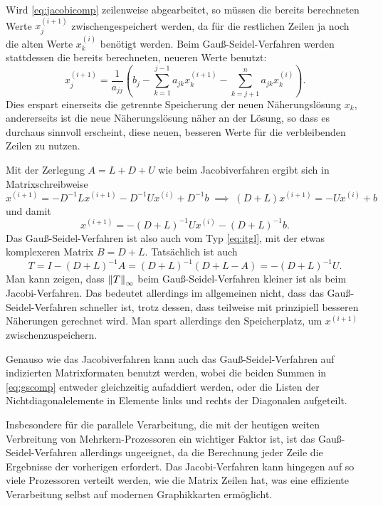 Wird \eqref{eq:jacobicomp} zeilenweise abgearbeitet, so müssen die
bereits berechneten Werte $x_j^{(i+1)}$ zwischengespeichert werden,
da für die restlichen Zeilen ja noch die alten Werte $x_k^{(i)}$
benötigt werden. Beim Gauß-Seidel-Verfahren werden stattdessen die
bereits berechneten, neueren Werte benutzt:
\begin{equation}
  \label{eq:gscomp}
  x_j^{(i+1)} = \frac{1}{a_{jj}}\left(b_j -
    \sum_{k=1}^{j-1} a_{jk}x_k^{(i+1)} - \sum_{k=j+1}^n a_{jk}x_k^{(i)}\right).
\end{equation}
Dies erspart einerseits die getrennte Speicherung der neuen
Näherungslösung $x_k$, andererseits ist die neue Näherungslösung näher
an der Lösung, so dass es durchaus sinnvoll erscheint, diese neuen, besseren
Werte für die verbleibenden Zeilen zu nutzen.

Mit der Zerlegung $A=L + D + U$ wie beim Jacobiverfahren ergibt sich
in Matrixschreibweise
\begin{equation}
  x^{(i+1)} = -D^{-1}L x^{(i+1)} - D^{-1} U x^{(i)} + D^{-1}b
  \;\implies\;
  (D + L)x^{(i+1)} = - U x^{(i)} + b
\end{equation}
und damit
\begin{equation}
  x^{(i+1)} = -(D+L)^{-1} U x^{(i)} - (D+L)^{-1}b.
\end{equation}
Das Gauß-Seidel-Verfahren ist also auch vom Typ \eqref{eq:itgl}, mit
der etwas komplexeren Matrix $B= D + L$. Tatsächlich ist auch
\begin{equation}
  \label{eq:gst}
  T = I - (D + L)^{-1} A = (D + L)^{-1}(D + L - A) = -(D+L)^{-1} U.
\end{equation}
Man kann zeigen, dass $\left\lVert{T}\right\rVert_\infty$ beim Gauß-Seidel-Verfahren
kleiner ist als beim Jacobi-Verfahren. Das bedeutet allerdings im
allgemeinen nicht, dass das Gauß-Seidel-Verfahren schneller ist, trotz
dessen, dass teilweise mit prinzipiell besseren Näherungen gerechnet
wird. Man spart allerdings den Speicherplatz, um $x^{(i+1)}$
zwischenzuspeichern.

Genauso wie das Jacobiverfahren kann auch das Gauß-Seidel-Verfahren
auf indizierten Matrixformaten benutzt werden, wobei die beiden Summen
in \eqref{eq:gscomp} entweder gleichzeitig aufaddiert werden, oder die
Listen der Nichtdiagonalelemente in Elemente links und rechts der
Diagonalen aufgeteilt.

Insbesondere für die parallele Verarbeitung, die mit der heutigen
weiten Verbreitung von Mehrkern-Prozessoren ein wichtiger Faktor ist,
ist das Gauß-Seidel-Verfahren allerdings ungeeignet, da die Berechnung
jeder Zeile die Ergebnisse der vorherigen erfordert. Das
Jacobi-Verfahren kann hingegen auf so viele Prozessoren verteilt
werden, wie die Matrix Zeilen hat, was eine effiziente Verarbeitung
selbst auf modernen Graphikkarten ermöglicht.

